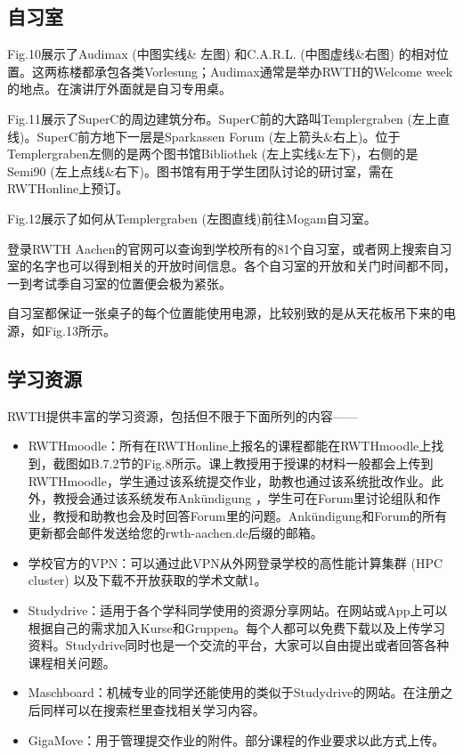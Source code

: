   \subsection{自习室}

    Fig.10展示了Audimax (中图实线\& 左图) 和C.A.R.L. (中图虚线\&右图) 的相对位置。这两栋楼都承包各类Vorlesung；Audimax通常是举办RWTH的Welcome week的地点。在演讲厅外面就是自习专用桌。

    Fig.11展示了SuperC的周边建筑分布。SuperC前的大路叫Templergraben (左上直线)。SuperC前方地下一层是Sparkassen Forum (左上箭头\&右上)。位于Templergraben左侧的是两个图书馆Bibliothek (左上实线\&左下)，右侧的是Semi90 (左上点线\&右下)。图书馆有用于学生团队讨论的研讨室，需在RWTHonline上预订。

    Fig.12展示了如何从Templergraben (左图直线)前往Mogam自习室。

    登录RWTH Aachen的官网可以查询到学校所有的81个自习室，或者网上搜索自习室的名字也可以得到相关的开放时间信息。各个自习室的开放和关门时间都不同，一到考试季自习室的位置便会极为紧张。

    自习室都保证一张桌子的每个位置能使用电源，比较别致的是从天花板吊下来的电源，如Fig.13所示。

  \subsection{学习资源}

    RWTH提供丰富的学习资源，包括但不限于下面所列的内容——

    \begin{itemize}
      \item RWTHmoodle：所有在RWTHonline上报名的课程都能在RWTHmoodle上找到，截图如B.7.2节的Fig.8所示。课上教授用于授课的材料一般都会上传到RWTHmoodle，学生通过该系统提交作业，助教也通过该系统批改作业。此外，教授会通过该系统发布Ankündigung ，学生可在Forum里讨论组队和作业，教授和助教也会及时回答Forum里的问题。Ankündigung和Forum的所有更新都会邮件发送给您的rwth-aachen.de后缀的邮箱。
      \item 学校官方的VPN：可以通过此VPN从外网登录学校的高性能计算集群 (HPC cluster) 以及下载不开放获取的学术文献1。
      \item Studydrive：适用于各个学科同学使用的资源分享网站。在网站或App上可以根据自己的需求加入Kurse和Gruppen。每个人都可以免费下载以及上传学习资料。Studydrive同时也是一个交流的平台，大家可以自由提出或者回答各种课程相关问题。
      \item Maschboard：机械专业的同学还能使用的类似于Studydrive的网站。在注册之后同样可以在搜索栏里查找相关学习内容。
      \item GigaMove：用于管理提交作业的附件。部分课程的作业要求以此方式上传。
    \end{itemize}

